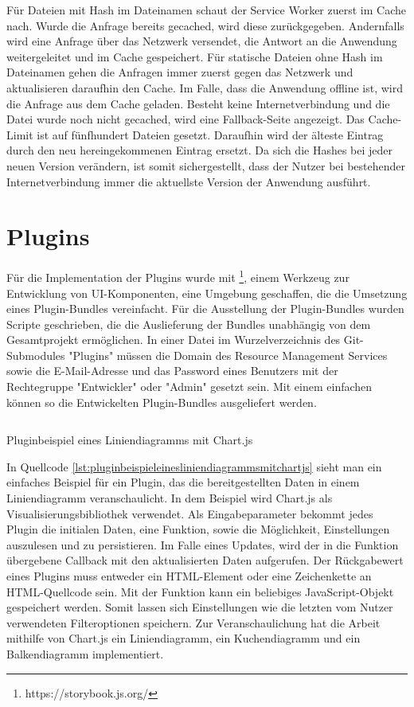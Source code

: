 Für Dateien mit Hash im Dateinamen schaut der Service Worker zuerst im Cache nach.
Wurde die Anfrage bereits gecached, wird diese zurückgegeben. Andernfalls wird eine Anfrage über das
Netzwerk versendet, die Antwort an die Anwendung weitergeleitet und im Cache gespeichert.
Für statische Dateien ohne Hash im Dateinamen gehen die Anfragen immer zuerst gegen das Netzwerk und
aktualisieren daraufhin den Cache. Im Falle, dass die Anwendung offline ist, wird die Anfrage aus
dem Cache geladen. Besteht keine Internetverbindung und die Datei wurde noch nicht gecached, wird
eine Fallback-Seite angezeigt. Das Cache-Limit ist auf fünfhundert Dateien gesetzt. Daraufhin wird der älteste
Eintrag durch den neu hereingekommenen Eintrag ersetzt. Da sich die Hashes bei jeder neuen Version verändern,
ist somit sichergestellt, dass der Nutzer bei bestehender Internetverbindung immer die aktuellste Version
der Anwendung ausführt.

\section{Plugins}
\label{sec:plugins}
Für die Implementation der Plugins wurde mit \footnote{https://storybook.js.org/}, einem Werkzeug
zur Entwicklung von UI-Komponenten, eine Umgebung geschaffen, die die Umsetzung eines Plugin-Bundles vereinfacht.
Für die Ausstellung der Plugin-Bundles wurden Scripte geschrieben, die die Auslieferung der Bundles unabhängig
von dem Gesamtprojekt ermöglichen. In einer  Datei im Wurzelverzeichnis des Git-Submodules "Plugins"
müssen die Domain des Resource Management Services sowie die E-Mail-Adresse und das Password eines Benutzers mit
der Rechtegruppe "Entwickler" oder "Admin" gesetzt sein. Mit einem einfachen  können so
die Entwickelten Plugin-Bundles ausgeliefert werden.

\begin{listing}
    \inputminted{js}{snippets/js/ChartExample.js}
    \caption{Pluginbeispiel eines Liniendiagramms mit Chart.js}
    \label{lst:pluginbeispieleinesliniendiagrammsmitchartjs}
\end{listing}

In Quellcode \ref{lst:pluginbeispieleinesliniendiagrammsmitchartjs} sieht man ein einfaches
Beispiel für ein Plugin, das die bereitgestellten Daten in einem Liniendiagramm veranschaulicht.
In dem Beispiel wird Chart.js als Visualisierungsbibliothek verwendet. Als Eingabeparameter
bekommt jedes Plugin die initialen Daten, eine  Funktion, sowie die Möglichkeit,
Einstellungen auszulesen und zu persistieren. Im Falle eines Updates, wird der in die
 Funktion übergebene Callback mit den aktualisierten Daten aufgerufen.
Der Rückgabewert eines Plugins muss entweder ein HTML-Element oder eine Zeichenkette an HTML-Quellcode
sein. Mit der  Funktion kann ein beliebiges JavaScript-Objekt gespeichert werden.
Somit lassen sich Einstellungen wie die letzten vom Nutzer verwendeten Filteroptionen speichern.
Zur Veranschaulichung hat die Arbeit mithilfe von Chart.js ein Liniendiagramm, ein Kuchendiagramm und
ein Balkendiagramm implementiert.

